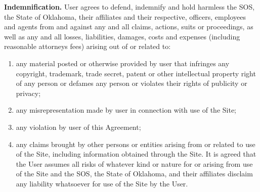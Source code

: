 \textbf{Indemnification.}
User agrees to defend, indemnify and hold harmless the SOS, the State of
Oklahoma, their affiliates and their respective, officers, employees and agents
from and against any and all claims, actions, suits or proceedings, as well as
any and all losses, liabilities, damages, costs and expenses (including
reasonable attorneys fees) arising out of or related to:
\begin{enumerate}[label=\roman*)]
    \item any material posted or otherwise provided by user that infringes any
    copyright, trademark, trade secret, patent or other intellectual property
    right of any person or defames any person or violates their rights of
    publicity or privacy;
    \item any misrepresentation made by user in connection with use of the Site;
    \item any violation by user of this Agreement;
    \item any claims brought by other persons or entities arising from or
    related to use of the Site, including information obtained through the Site.
    It is agreed that the User assumes all risks of whatever kind or nature for
    or arising from use of the Site and the SOS, the State of Oklahoma, and
    their affiliates disclaim any liability whatsoever for use of the Site by
    the User.
\end{enumerate}